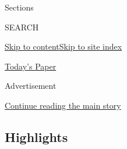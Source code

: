 Sections

SEARCH

\protect\hyperlink{site-content}{Skip to
content}\protect\hyperlink{site-index}{Skip to site index}

\href{https://myaccount.nytimes.com/auth/login?response_type=cookie\&client_id=vi}{}

\href{https://www.nytimes.com/section/todayspaper}{Today's Paper}

Advertisement

\protect\hyperlink{after-top}{Continue reading the main story}

\hypertarget{highlights}{%
\subsection{Highlights}\label{highlights}}

